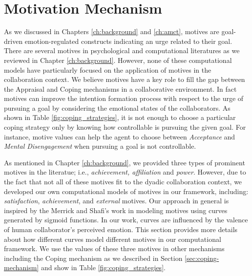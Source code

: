 \documentclass[12pt]{report}
\begin{document}
\section{Motivation Mechanism}
\label{sec:motivation_mechanism}
As we discussed in Chapters \ref{ch:background} and \ref{ch:amct}, motives are
goal-driven emotion-regulated constructs indicating an urge related to their
goal. There are several motives in psychological and computational literatures
as we reviewed in Chapter \ref{ch:background}. However, none of these
computational models have particularly focused on the application of motives in
the collaboration context. {\color{red}We believe motives have a key role to
fill the gap between the Appraisal and Coping mechanisms in a collaborative
environment. In fact motives can improve the intention formation process with
respect to the urge of pursuing a goal by considering the emotional states of
the collaborators. As shown in Table \ref{fig:coping_strategies}, it is not
enough to choose a particular coping strategy only by knowing how controllable
is pursuing the given goal. For instance, motive values can help the agent to
choose between \textit{Acceptance} and \textit{Mental Disengagement} when
pursuing a goal is not controllable.}

{\color{red}As mentioned in Chapter \ref{ch:background}, we provided three types
of prominent motives in the literatue; i.e., \textit{achievement, affiliation} and
\textit{power}. However, due to the fact that not all of these motives fit to
the dyadic collaboration context, we developed our own computational models of
motives in our framework, including: \textit{satisfaction},
\textit{achievement}, and \textit{external} motives. Our approach in general is
inspired by the Merrick and Shafi's work in
\cite{merrick:acheievement-affiliation-power} modeling motives using curves
generated by sigmoid functions. In our work, curves are influenced by the
valence of human collaborator's perceived emotion. This section provides more
details about how different curves model different motives in our computational
framework.} We use the values of these three motives in other mechanisms
including the Coping mechanism as we described in Section
\ref{sec:coping-mechanism} and show in Table \ref{fig:coping_strategies}.
\end{document}

